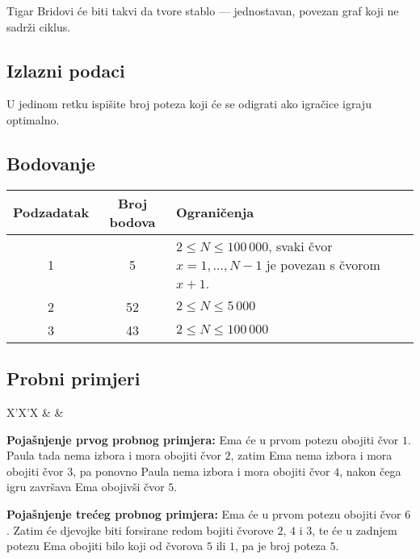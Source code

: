 \begin{statement}[
  problempoints=100,
  timelimit=1 sekunda,
  memorylimit=512 MiB,
]{Tigar}
Bridovi će biti takvi da tvore stablo --- jednostavan, povezan graf koji ne
sadrži ciklus.

\subsection*{Izlazni podaci}

U jedinom retku ispišite broj poteza koji će se odigrati ako igračice igraju
optimalno.

\subsection*{Bodovanje}

{\renewcommand{\arraystretch}{1.4}
  \setlength{\tabcolsep}{6pt}
  \begin{tabular}{ccl}
   Podzadatak & Broj bodova & Ograničenja \\ \midrule
    1 & 5 & $2 \le N \le 100\,000$, svaki čvor $x=1,\ldots,N-1$ je povezan s čvorom $x+1$.\\
    2 & 52 & $2 \le N \le 5\,000$ \\
    3 & 43 & $2 \le N \le 100\,000$
\end{tabular}}

\subsection*{Probni primjeri}
\begin{tabularx}{\textwidth}{X'X'X}
 &
 &
\end{tabularx}

\textbf{Pojašnjenje prvog probnog primjera:} Ema će u prvom potezu obojiti
čvor $1$. Paula tada nema izbora i mora obojiti čvor $2$, zatim Ema nema izbora
i mora obojiti čvor $3$, pa ponovno Paula nema izbora i mora obojiti čvor $4$,
nakon čega igru završava Ema obojivši čvor $5$.

\textbf{Pojašnjenje trećeg probnog primjera:} Ema će u prvom potezu obojiti čvor
$6$. Zatim će djevojke biti forsirane redom bojiti čvorove $2$, $4$ i $3$, te će
u zadnjem potezu Ema obojiti bilo koji od čvorova $5$ ili $1$, pa je broj poteza
$5$.

\end{statement}

